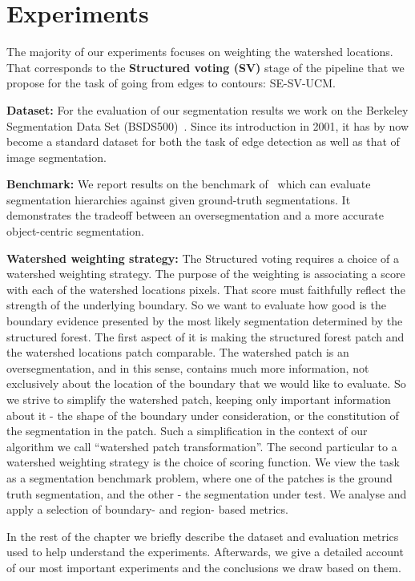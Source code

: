 \chapter{Experiments} %
\label{Chapter5}
The majority of our experiments focuses on weighting the watershed locations. That corresponds to the \textbf{Structured voting (SV)} stage of the pipeline that we propose for the task of going from edges to contours: SE-SV-UCM.

\textbf{Dataset:} For the evaluation of our segmentation results we work on the Berkeley Segmentation Data Set (BSDS500)~\cite{Arbelaez11}. Since its introduction in 2001, it has by now become a standard dataset for both the task of edge detection as well as that of image segmentation.

\textbf{Benchmark:} We report results on the benchmark of~\cite{Galasso13} which can evaluate segmentation hierarchies against given ground-truth segmentations. It demonstrates the tradeoff between an oversegmentation and a more accurate object-centric segmentation.

\textbf{Watershed weighting strategy:} The Structured voting requires a choice of a watershed weighting strategy. The purpose of the weighting is associating a score with each of the watershed locations pixels. That score must faithfully reflect the strength of the underlying boundary. So we want to evaluate how good is the boundary evidence presented by the most likely segmentation determined by the structured forest. 
The first aspect of it is making the structured forest patch and the watershed locations patch comparable. The watershed patch is an oversegmentation, and in this sense, contains much more information, not exclusively about the location of the boundary that we would like to evaluate. So we strive to simplify the watershed patch, keeping only important information about it - the shape of the boundary under consideration, or the constitution of the segmentation in the patch. Such a simplification in the context of our algorithm we call ``watershed patch transformation''. 
The second particular to a watershed weighting strategy is the choice of scoring function. We view the task as a segmentation benchmark problem, where one of the patches is the ground truth segmentation, and the other - the segmentation under test. We analyse and apply a selection of boundary- and region- based metrics.

In the rest of the chapter we briefly describe the dataset and evaluation metrics used to help understand the experiments. Afterwards, we give a detailed account of our most important experiments and the conclusions we draw based on them.

